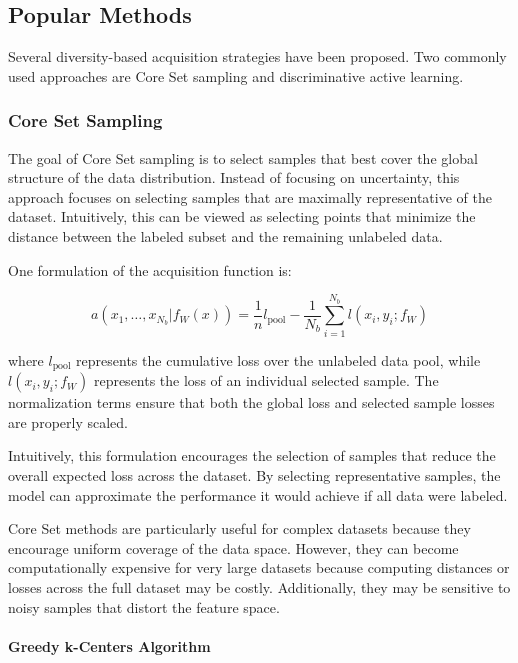 \documentclass{article}
\begin{document}
\subsection{Popular Methods}

Several diversity-based acquisition strategies have been proposed. Two commonly used approaches are Core Set sampling and discriminative active learning.

\subsubsection{Core Set Sampling}

The goal of Core Set sampling is to select samples that best cover the global structure of the data distribution. Instead of focusing on uncertainty, this approach focuses on selecting samples that are maximally representative of the dataset. Intuitively, this can be viewed as selecting points that minimize the distance between the labeled subset and the remaining unlabeled data.

One formulation of the acquisition function is:

\begin{equation}
a(x_1, \dots, x_{N_b} | f_W(x)) =
\frac{1}{n} l_{\text{pool}} -
\frac{1}{N_b} \sum_{i=1}^{N_b} l(x_i, y_i; f_W)
\end{equation}

where \(l_{\text{pool}}\) represents the cumulative loss over the unlabeled data pool, while \(l(x_i, y_i; f_W)\) represents the loss of an individual selected sample. The normalization terms ensure that both the global loss and selected sample losses are properly scaled.

Intuitively, this formulation encourages the selection of samples that reduce the overall expected loss across the dataset. By selecting representative samples, the model can approximate the performance it would achieve if all data were labeled.

Core Set methods are particularly useful for complex datasets because they encourage uniform coverage of the data space. However, they can become computationally expensive for very large datasets because computing distances or losses across the full dataset may be costly. Additionally, they may be sensitive to noisy samples that distort the feature space.

\paragraph{Greedy k-Centers Algorithm}
\end{document}
